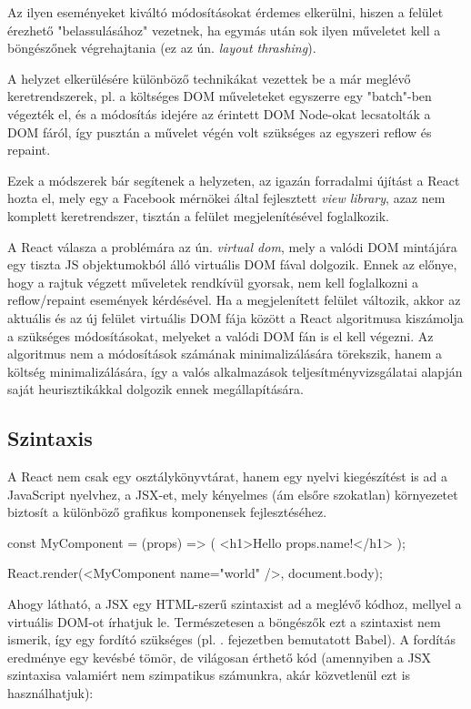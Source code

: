 Az ilyen eseményeket kiváltó módosításokat érdemes elkerülni, hiszen a felület
érezhető "belassulásához" vezetnek, ha egymás után sok ilyen műveletet kell a
böngészőnek végrehajtania (ez az ún. \emph{layout
  thrashing}\cite{layoutthrashing}).

A helyzet elkerülésére különböző technikákat vezettek be a már meglévő
keretrendszerek, pl. a költséges DOM műveleteket egyszerre egy "batch"-ben
végezték el\cite{fastdom}, és a módosítás idejére az érintett DOM Node-okat
lecsatolták a DOM fáról, így pusztán a művelet végén volt szükséges az egyszeri
reflow és repaint.

Ezek a módszerek bár segítenek a helyzeten, az igazán forradalmi újítást a React
hozta el, mely egy a Facebook mérnökei által fejlesztett \emph{view library},
azaz nem komplett keretrendszer, tisztán a felület megjelenítésével
foglalkozik\cite{react}.

A React válasza a problémára az ún. \emph{virtual dom}\cite{vdom}, mely a valódi
DOM mintájára egy tiszta JS objektumokból álló virtuális DOM fával dolgozik.
Ennek az előnye, hogy a rajtuk végzett műveletek rendkívül gyorsak, nem kell
foglalkozni a reflow/repaint események kérdésével. Ha a megjelenített felület
változik, akkor az aktuális és az új felület virtuális DOM fája között a React
algoritmusa kiszámolja a szükséges módosításokat, melyeket a valódi DOM fán is
el kell végezni. Az algoritmus nem a módosítások számának minimalizálására
törekszik, hanem a költség minimalizálására, így a valós alkalmazások
teljesítményvizsgálatai alapján saját heurisztikákkal dolgozik ennek
megállapítására\cite{reactheur}.

\subsection{Szintaxis}

A React nem csak egy osztálykönyvtárat, hanem egy nyelvi kiegészítést is ad a
JavaScript nyelvhez, a JSX-et, mely kényelmes (ám elsőre szokatlan) környezetet
biztosít a különböző grafikus komponensek fejlesztéséhez.

\begin{js}
const MyComponent = (props) => (
  <h1>Hello {props.name}!</h1>
);

React.render(<MyComponent name="world" />, document.body);
\end{js}

Ahogy látható, a JSX egy HTML-szerű szintaxist ad a meglévő kódhoz, mellyel a
virtuális DOM-ot írhatjuk le. Természetesen a böngészők ezt a szintaxist nem
ismerik, így egy fordító szükséges (pl. . fejezetben bemutatott
Babel). A fordítás eredménye egy kevésbé tömör, de világosan érthető kód
(amennyiben a JSX szintaxisa valamiért nem szimpatikus számunkra, akár
közvetlenül ezt is használhatjuk):

